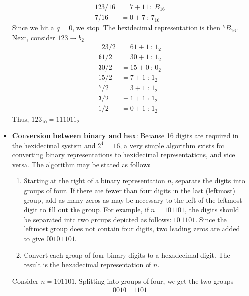 \documentclass{report}
\begin{document}
\begin{itemize}
            \begin{align*}
                123/16 &= 7 + 11 \ : \ B_{16}\\
                7/16 &= 0 + 7 \ : \ 7_{16}
            \end{align*}
            Since we hit a $q=0$, we stop. The hexidecimal representation is then $7B_{16}$. Next, consider $123 \to b_{2} $
            \begin{align*}
                123/2 &= 61 + 1 \ :\ 1_{2} \\
                61 /2 &=30 + 1 \ : \ 1_{2} \\
                30 / 2 &= 15 + 0 \ : \ 0_{2} \\
                15 /2 &= 7 + 1 \ : \ 1_{2} \\
                7 / 2 &= 3 + 1 \ : \ 1_{2} \\
                3 / 2 &= 1 + 1 \ : \ 1_{2} \\
                1 / 2 &= 0 + 1 \ : \ 1_{2}
            \end{align*}
            Thus, $123_{10} = 111011_{2}$
        \item \textbf{Conversion between binary and hex}: Because 16 digits are required in the hexidecimal system and $2^{4} = 16$, a very simple algorithm exists for converting binary representations to hexidecimal representations, and vice versa.
            \bigbreak \noindent 
            The algorithm may be stated as follows
            \begin{enumerate}
                \item Starting at the right of a binary representation \(n\), separate the digits into groups of four. If there are fewer than four digits in the last (leftmost) group, add as many zeros as may be necessary to the left of the leftmost digit to fill out the group. For example, if \(n = 101101\), the digits should be separated into two groups depicted as follows: \(10 \, 1101\). Since the leftmost group does not contain four digits, two leading zeros are added to give \(0010 \, 1101\).
                \item Convert each group of four binary digits to a hexadecimal digit. The result is the hexadecimal representation of \(n\).
            \end{enumerate}
            Consider $n=101101$. Splitting into groups of four, we get the two groups
            \begin{align*}
                0010 \quad 1101
            \end{align*}

\end{itemize}
\end{document}
